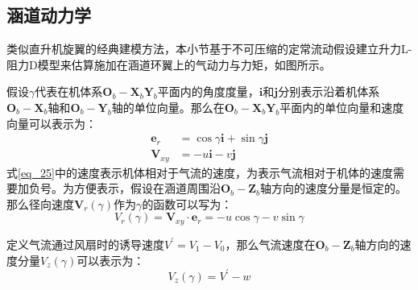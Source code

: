 \subsection{涵道动力学}

类似直升机旋翼的经典建模方法，本小节基于不可压缩的定常流动假设建立升力L-阻力D模型来估算施加在涵道环翼上的气动力与力矩\cite{johnsonModelingControlFlight2006b}，如图所示。

假设$\gamma$代表在机体系${\boldsymbol{O}_b}-{\boldsymbol{X}_b}{\boldsymbol{Y}_b}$平面内的角度度量，$\boldsymbol{i}$和$\boldsymbol{j}$分别表示沿着机体系${\boldsymbol{O}_b}-{\boldsymbol{X}_b}$轴和${\boldsymbol{O}_b}-{\boldsymbol{Y}_b}轴$的单位向量。那么在${\boldsymbol{O}_b}-{\boldsymbol{X}_b}{\boldsymbol{Y}_b}$平面内的单位向量和速度向量可以表示为：
\begin{align}
    \boldsymbol{e}_{r}&=\cos\gamma\boldsymbol{i}+\sin\gamma\boldsymbol{j} \label{eq_24}\\
    \boldsymbol{V}_{xy}&=-u\boldsymbol{i}-v\boldsymbol{j} \label{eq_25}
\end{align}
式\eqref{eq_25}中的速度表示机体相对于气流的速度，为表示气流相对于机体的速度需要加负号。为方便表示，假设在涵道周围沿${\boldsymbol{O}_b}-{\boldsymbol{Z}_b}$轴方向的速度分量是恒定的。那么径向速度$\boldsymbol{V}_{r}(\gamma)$作为$\gamma$的函数可以写为：
\begin{equation}
    V_r(\gamma)=\boldsymbol{V}_{xy}\cdot{\boldsymbol{e}}_r=-u\cos\gamma-v\sin\gamma    \label{eq_26}
\end{equation}

定义气流通过风扇时的诱导速度$V^{\prime}=V_1-V_0$，那么气流速度在${\boldsymbol{O}_b}-{\boldsymbol{Z}_b}$轴方向的速度分量$V_z(\gamma)$可以表示为：
\begin{equation}
    V_z(\gamma)=V^{\prime}-w   \label{eq_27}
\end{equation}

